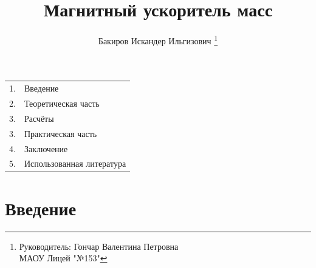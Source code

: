 \documentclass[14pt]{extarticle}
\title{Магнитный ускоритель масс}
\author{Бакиров Искандер Ильгизович \thanks{ Руководитель: Гончар Валентина Петровна \\ МАОУ Лицей "№153"}}
\begin{document}
\maketitle

\vspace{7cm}
\begin{center} 
\begin{tabular}{cl} 
1. & Введение \\  
2. & Теоретическая часть \\  
3. & Расчёты \\
3. & Практическая часть \\
4. & Заключение \\
5. & Использованная литература
\end{tabular} 
\end{center}





\newpage
\section{Введение}
\end{document}
